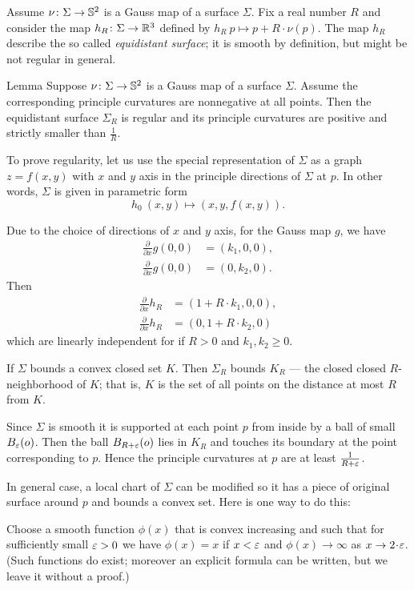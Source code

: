 Assume $\nu\colon\Sigma\to \mathbb{S}^2$ is a Gauss map of a surface $\Sigma$.
Fix a real number $R$ and consider the map $h_R\colon\Sigma\to\mathbb{R}^3$ defined by $h_R\:p\mapsto p+R\cdot\nu(p)$.
The map $h_R$ describe the so called \emph{equidistant surface};
it is smooth by definition, but might be not regular in general.

\begin{thm}{Lemma}\label{lem:curc<1/R}
Suppose $\nu\colon\Sigma\to \mathbb{S}^2$ is a Gauss map of a surface $\Sigma$.
Assume the corresponding principle curvatures are nonnegative at all points. 
Then the equidistant surface $\Sigma_R$ is regular and its principle curvatures are positive and strictly smaller than $\tfrac1R$.
\end{thm}

To prove regularity, let us use the special representation of $\Sigma$ as a graph $z=f(x,y)$ with $x$ and $y$ axis in the principle directions of $\Sigma$ at $p$.
In other words, $\Sigma$ is given in parametric form 
\[h_0\:(x,y)\mapsto (x,y,f(x,y)).\]

Due to the choice of directions of $x$ and $y$ axis,
for the Gauss map $g$, we have 
\begin{align*}
\tfrac{\partial}{\partial x}g(0,0)&=(k_1,0,0),
\\
\tfrac{\partial}{\partial x}g(0,0)&=(0,k_2,0).
\end{align*}
Then 
\begin{align*}
\tfrac{\partial}{\partial x} h_R&=(1+R\cdot k_1,0,0),
\\
\tfrac{\partial}{\partial x} h_R&=(0,1+R\cdot k_2,0)
\end{align*}
which are linearly independent for if $R>0$ and $k_1,k_2\ge 0$. 

If $\Sigma$ bounds a convex closed set $K$.
Then $\Sigma_R$ bounds $K_R$ --- the closed closed $R$-neighborhood of $K$;
that is, $K$ is the set of all points on the distance at most $R$ from $K$.

Since $\Sigma$ is smooth it is supported at each point $p$ from inside by a ball of small $B_\varepsilon(o)$.
Then the ball $B_{R+\varepsilon}(o)$ lies in $K_R$ and touches its boundary at the point corresponding to $p$.
Hence the principle curvatures at $p$ are at least $\tfrac1{R+\varepsilon}$.

In general case, a local chart of $\Sigma$ can be modified so it has a piece of original surface around $p$  and bounds a convex set.
Here is one way to do this:

Choose a smooth function $\phi(x)$ that is convex increasing and such that for sufficiently small $\varepsilon>0$ we have $\phi(x)=x$ if $x<\varepsilon$ and $\phi(x)\to\infty$ as $x\to 2\cdot\eps$.
(Such functions do exist; moreover an explicit formula can be written, but we leave it without a proof.)

